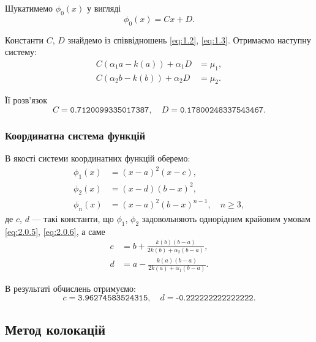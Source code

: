 Шукатимемо $\phi_0(x)$ у вигляді
\begin{equation}
    \label{eq:2.0.7}
    \phi_0(x) = C x + D.
\end{equation}

Константи $C$, $D$ знайдемо із співвідношень \eqref{eq:1.2},  \eqref{eq:1.3}. Отримаємо наступну систему:
\begin{align}
    \label{eq:2.0.8}
    C (\alpha_1 a - k(a)) + \alpha_1 D &= \mu_1, \\
    \label{eq:2.0.9}
    C (\alpha_2 b - k(b)) + \alpha_2 D &= \mu_2.
\end{align}

Її розв'язок
\begin{equation}
    \label{eq:2.0.10}
    C = \texttt{0.7120099335017387}, \quad D = \texttt{0.17800248337543467}.
\end{equation}

\subsubsection{Координатна система функцій}

В якості системи координатних функцій оберемо:
\begin{align}
    \label{eq:2.0.11}
    \phi_1(x) &= (x - a)^2 (x - c), \\
    \label{eq:2.0.12}
    \phi_2(x) &= (x - d) (b - x)^2, \\
    \label{eq:2.0.13}
    \phi_n(x) &= (x - a)^2 (b - x)^{n - 1}, \quad n \ge 3,
\end{align}
де $c$, $d$ --- такі константи, що $\phi_1$, $\phi_2$ задовольняють однорідним крайовим умовам \eqref{eq:2.0.5}, \eqref{eq:2.0.6}, а саме
\begin{align}
     \label{eq:2.0.14}
     c &= b + \frac{k(b) (b - a)}{2 k(b) + \alpha_2 (b - a)}, \\
     \label{eq:2.0.15}
     d &= a - \frac{k(a) (b - a)}{2 k(a) + \alpha_1 (b - a)}.
\end{align}

В результаті обчислень отримуємо:
\begin{equation}
    \label{eq:2.0.16}
    c = \texttt{3.96274583524315}, \quad d = \texttt{-0.222222222222222}.
\end{equation}


\subsection{Метод колокацій}


